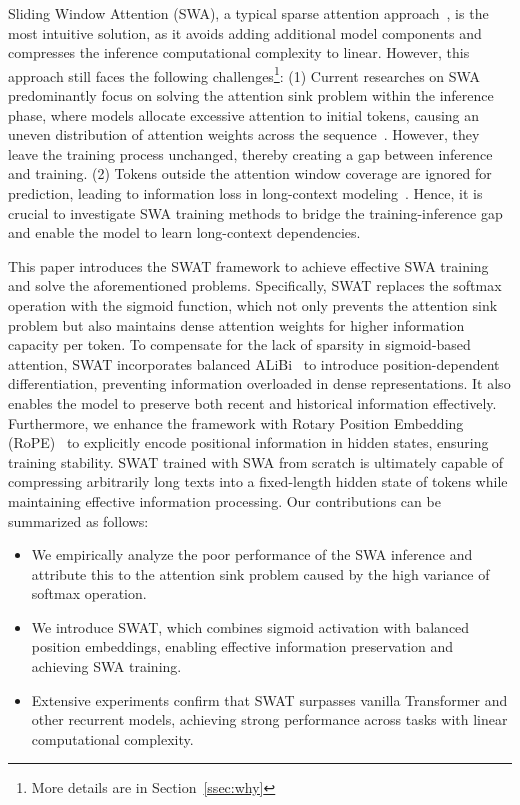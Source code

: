 Sliding Window Attention (SWA), a typical sparse attention approach~\cite{sparsetransformer}, is the most intuitive solution, as it avoids adding additional model components and compresses the inference computational complexity to linear. 
However, this approach still faces the following challenges\footnote{More details are in Section~\ref{ssec:why}}: 
(1) Current researches on SWA predominantly focus on solving the attention sink problem within the inference phase, where models allocate excessive attention to initial tokens, causing an uneven distribution of attention weights across the sequence~\cite{streamingllm}. However, they leave the training process unchanged, thereby creating a gap between inference and training.
(2) Tokens outside the attention window coverage are ignored for prediction, leading to information loss in long-context modeling~\cite{lm-infinite,sigmoidatt}.
Hence, it is crucial to investigate SWA training methods to bridge the training-inference gap and enable the model to learn long-context dependencies.

This paper introduces the SWAT framework to achieve effective SWA training and solve the aforementioned problems. Specifically, SWAT replaces the softmax operation with the sigmoid function, which not only prevents the attention sink problem but also maintains dense attention weights for higher information capacity per token.
To compensate for the lack of sparsity in sigmoid-based attention, SWAT incorporates balanced ALiBi~\cite{alibi} to introduce position-dependent differentiation, preventing information overloaded in dense representations. It also enables the model to preserve both recent and historical information effectively.
Furthermore, we enhance the framework with Rotary Position Embedding (RoPE)~\cite{rope} to explicitly encode positional information in hidden states, ensuring training stability.
SWAT trained with SWA from scratch is ultimately capable of compressing arbitrarily long texts into a fixed-length hidden state of tokens while maintaining effective information processing.
Our contributions can be summarized as follows:
\begin{itemize}[leftmargin=*, itemsep=0pt]
    \item We empirically analyze the poor performance of the SWA inference and attribute this to the attention sink problem caused by the high variance of softmax operation.
    \item We introduce SWAT, which combines sigmoid activation with balanced position embeddings, enabling effective information preservation and achieving SWA training.
    \item Extensive experiments confirm that SWAT surpasses vanilla Transformer and other recurrent models, achieving strong performance across tasks with linear computational complexity.
\end{itemize}


